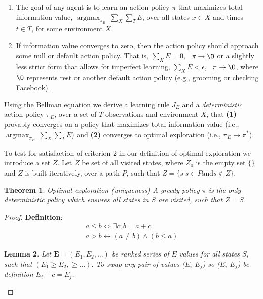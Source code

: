 \documentclass[9pt,twocolumn,twoside]{pnas-new}
\DeclareMathOperator*{\argmax}{argmax}
\newtheorem{theorem}{Theorem}
\newtheorem{lemma}[theorem]{Lemma}
\begin{document}
{{\begin{enumerate}[noitemsep,wide=0pt,leftmargin=\dimexpr\labelwidth+2\labelsep\relax]
    \item The goal of any agent is to learn an action policy $\pi$ that maximizes total information value, $\argmax_{\pi_E} \ \sum_X \sum_T E$, over all states $x \in X$ and times $t \in T$, for some environment $X$.
    \item If information value converges to zero, then the action policy should approach some null or default action policy. That is, $\sum_X E = 0$, \ $\pi \rightarrow \O$ or a slightly less strict form that allows for imperfect learning, $\sum_X E < \epsilon $, \ $\pi \rightarrow \O$, where $\O$ represents rest or another default action policy (e.g., grooming or checking Facebook).
\end{enumerate}

Using the Bellman equation we derive a learning rule $J_E$ and a \textit{deterministic} action policy $\pi_E$, over a set of $T$ observations and environment $X$, that \textbf{(1)} provably converges on a policy that maximizes total information value (i.e., $\argmax_{\pi_E} \ \sum_X \sum_T E$) and \textbf{(2)} converges to optimal exploration (i.e., $\pi_E \rightarrow \pi^*$).

To test for satisfaction of criterion 2 in our definition of optimal exploration we introduce a set $Z$. Let $Z$ be set of all visited states, where $Z_0$ is the empty set $\{\}$ and $Z$ is built iteratively, over a path $P$, such that $Z = \{s | s \in P \text{and} s \not\in Z\}$.

\begin{theorem}{Optimal exploration (uniqueness)}
A greedy policy $\pi$ is the only deterministic policy which ensures all states in $S$ are visited, such that $Z = S$.
\end{theorem}

\begin{proof}
    \textbf{Definition}: 
    \begin{align}
        a \leq b \Leftrightarrow \exists c; b = a + c \\
        a > b \leftrightarrow (a \neq b) \wedge (b \leq a) 
    \end{align}

    \begin{lemma}
    Let $\textbf{E} = (E_1, E_2, ...)$ be ranked series of $E$ values for all states $S$, such that $(E_1 \geq E_2, \geq ...)$. To swap any pair of values ($E_i$ \geq $E_j$) so ($E_i$ \leq $E_j$) be definition $E_i - c = E_j$.  


\end{lemma}
\end{proof}}}
\end{document}
